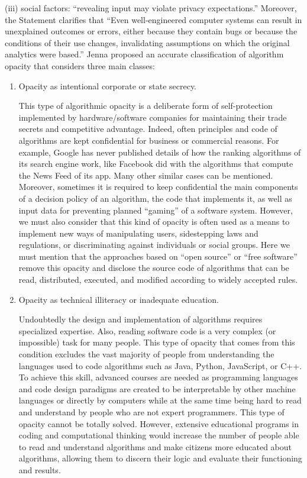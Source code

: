 \noindent (iii) social factors: ``revealing input may violate privacy expectations.'' Moreover, the Statement clarifies that ``Even well-engineered computer systems can result in unexplained outcomes or errors, either because they contain bugs or because the conditions of their use changes, invalidating assumptions on which the original analytics were based.'' Jenna \citet{chap:10:Burrell:2016} proposed an accurate classification of algorithm opacity that considers three main classes:

\bgroup
\def\labelenumi{(\arabic{enumi})}
\begin{enumerate}
\item Opacity as intentional corporate or state secrecy.

This type of algorithmic opacity is a deliberate form of self-protection implemented by hardware/software companies for maintaining their trade secrets and competitive advantage. Indeed, often principles and code of algorithms are kept confidential for business or commercial reasons. For example, Google has never published details of how the ranking algorithms of its search engine work, like Facebook did with the algorithms that compute the News Feed of its app. Many other similar cases can be mentioned. Moreover, sometimes it is required to keep confidential the main components of a decision policy of an algorithm, the code that implements it, as well as input data for preventing planned ``gaming'' of a software system. However, we must also consider that this kind of opacity is often used as a means to implement new ways of manipulating users, sidestepping laws and regulations, or discriminating against individuals or social groups. Here we must mention that the approaches based on ``open source'' or ``free software'' remove this opacity and disclose the source code of algorithms that can be read, distributed, executed, and modified according to widely accepted rules.

\item Opacity as technical illiteracy or inadequate education.

Undoubtedly the design and implementation of algorithms requires specialized expertise. Also, reading software code is a very complex (or impossible) task for many people. This type of opacity that comes from this condition excludes the vast majority of people from understanding the languages used to code algorithms such as Java, Python, JavaScript, or C++. To achieve this skill, advanced courses are needed as programming languages and code design paradigms are created to be interpretable by other machine languages or directly by computers while at the same time being hard to read and understand by people who are not expert programmers. This type of opacity cannot be totally solved. However, extensive educational programs in coding and computational thinking would increase the number of people able to read and understand algorithms and make citizens more\vadjust{\vspace*{14pt}\pagebreak} educated about \hbox{algorithms,} allowing them to discern their logic and evaluate their functioning and results.


\end{enumerate}
